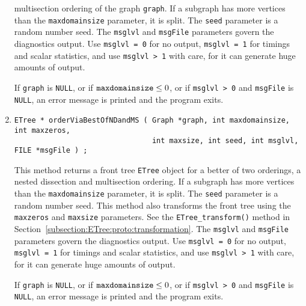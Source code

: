 \begin{enumerate}
multisection ordering of the graph {\tt graph}.
If a subgraph has more vertices than the {\tt maxdomainsize} parameter,
it is split.
The {\tt seed} parameter is a random number seed.
The {\tt msglvl} and {\tt msgFile} parameters govern the
diagnostics output.
Use {\tt msglvl = 0} for no output, {\tt msglvl = 1} for timings
and scalar statistics, and use {\tt msglvl > 1} with care, for it
can generate huge amounts of output.
\par {}
If {\tt graph} is {\tt NULL},
or if ${\tt maxdomainsize} \le 0$,
or if {\tt msglvl > 0} and {\tt msgFile} is {\tt NULL}, 
an error message is printed and the program exits.
\item
\begin{verbatim}
ETree * orderViaBestOfNDandMS ( Graph *graph, int maxdomainsize, int maxzeros,
                                int maxsize, int seed, int msglvl, FILE *msgFile ) ;
\end{verbatim}
This method returns a front tree {\tt ETree} object for a 
better of two orderings, a nested dissection 
and multisection ordering.
If a subgraph has more vertices than the {\tt maxdomainsize} parameter,
it is split.
The {\tt seed} parameter is a random number seed.
This method also transforms the front tree using the {\tt maxzeros}
and {\tt maxsize} parameters.
See the {\tt ETree\_transform()} method 
in Section~\ref{subsection:ETree:proto:transformation}.
The {\tt msglvl} and {\tt msgFile} parameters govern the
diagnostics output.
Use {\tt msglvl = 0} for no output, {\tt msglvl = 1} for timings
and scalar statistics, and use {\tt msglvl > 1} with care, for it
can generate huge amounts of output.
\par {}
If {\tt graph} is {\tt NULL},
or if ${\tt maxdomainsize} \le 0$,
or if {\tt msglvl > 0} and {\tt msgFile} is {\tt NULL}, 
an error message is printed and the program exits.
\end{enumerate}
\par
